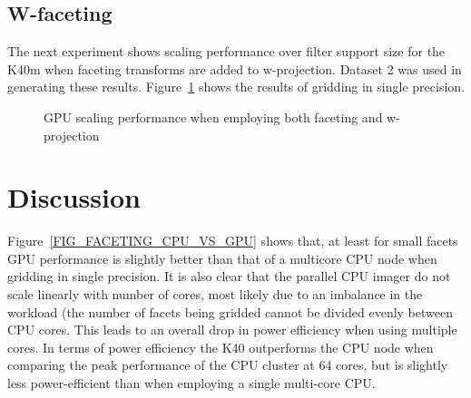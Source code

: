 \subsection{W-faceting}
The next experiment shows scaling performance over filter support size for the K40m 
when faceting transforms are added to w-projection. Dataset 2 was used in generating
these results. Figure~\ref{FIG_FACET_VS_NO_FACET_GPU} shows the results of gridding in
single precision.
\begin{figure}[ht!]
 \begin{mdframed}
 \centering
  \caption{GPU scaling performance when employing both faceting and w-projection}
  \label{FIG_FACET_VS_NO_FACET_GPU}
  \end{mdframed}
\end{figure}
\section{Discussion}
Figure~\ref{FIG_FACETING_CPU_VS_GPU} shows that, at least for small facets GPU performance is slightly better than that of a multicore CPU node when gridding in
single precision. It is also clear that the parallel CPU imager do not scale linearly with number of cores, most likely due to an imbalance in the workload (the number of
facets being gridded cannot be divided evenly between CPU cores. This leads to an overall drop in power
efficiency when using multiple cores. In terms of power efficiency the K40 outperforms the CPU node when comparing the peak performance
of the CPU cluster at 64 cores, but is slightly less power-efficient than when employing a single multi-core CPU.

